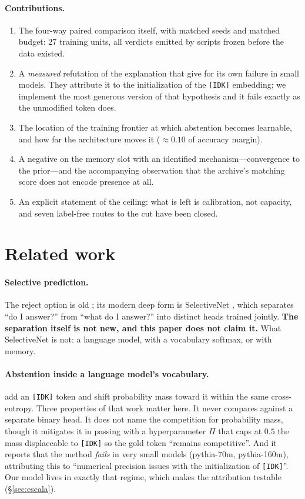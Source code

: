 \documentclass[11pt,a4paper]{article}
\begin{document}
\paragraph{Contributions.}
\begin{enumerate}
\item The four-way paired comparison itself, with matched seeds and matched budget: 27 training
units, all verdicts emitted by scripts frozen before the data existed.
\item A \emph{measured} refutation of the explanation that \citet{cohen2024idk} give for its own failure
in small models. They attribute it to the initialization of the \texttt{[IDK]} embedding; we
implement the most generous version of that hypothesis and it fails exactly as the unmodified token
does.
\item The location of the training frontier at which abstention becomes learnable, and how far the
architecture moves it ($\approx 0.10$ of accuracy margin).
\item A negative on the memory slot with an identified mechanism---convergence to the prior---and
the accompanying observation that the archive's matching score does not encode presence at all.
\item An explicit statement of the ceiling: what is left is calibration, not capacity, and seven
label-free routes to the cut have been closed.
\end{enumerate}

\section{Related work}

\paragraph{Selective prediction.} The reject option is old \citep{chow1970}; its modern deep form is
SelectiveNet \citep{geifman2019selectivenet}, which separates ``do I answer?'' from ``what do I
answer?'' into distinct heads trained jointly. \textbf{The separation itself is not new, and this
paper does not claim it.} What SelectiveNet is not: a language model, with a vocabulary softmax, or
with memory.

\paragraph{Abstention inside a language model's vocabulary.} \citet{cohen2024idk} add an
\texttt{[IDK]} token and shift probability mass toward it within the same cross-entropy. Three
properties of that work matter here. It never compares against a separate binary head. It
does not name the competition for probability mass, though it mitigates it in passing with a
hyperparameter $\Pi$ that caps at $0.5$ the mass displaceable to \texttt{[IDK]} so the gold token
``remains competitive''. And it reports that the method \emph{fails} in very small models
(pythia-70m, pythia-160m), attributing this to ``numerical precision issues with the initialization
of \texttt{[IDK]}''. Our model lives in exactly that regime, which makes the attribution testable
(\S\ref{sec:escala}).
\end{document}
